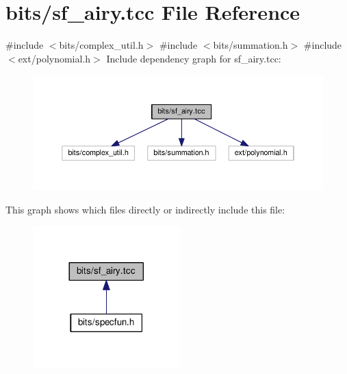 \hypertarget{sf__airy_8tcc}{}\section{bits/sf\+\_\+airy.tcc File Reference}
\label{sf__airy_8tcc}
{\ttfamily \#include $<$bits/complex\+\_\+util.\+h$>$}\newline
{\ttfamily \#include $<$bits/summation.\+h$>$}\newline
{\ttfamily \#include $<$ext/polynomial.\+h$>$}\newline
Include dependency graph for sf\+\_\+airy.\+tcc\+:
\nopagebreak
\begin{figure}[H]
\begin{center}
\leavevmode
\includegraphics[width=350pt]{sf__airy_8tcc__incl}
\end{center}
\end{figure}
This graph shows which files directly or indirectly include this file\+:
\nopagebreak
\begin{figure}[H]
\begin{center}
\leavevmode
\includegraphics[width=161pt]{sf__airy_8tcc__dep__incl}
\end{center}
\end{figure}

